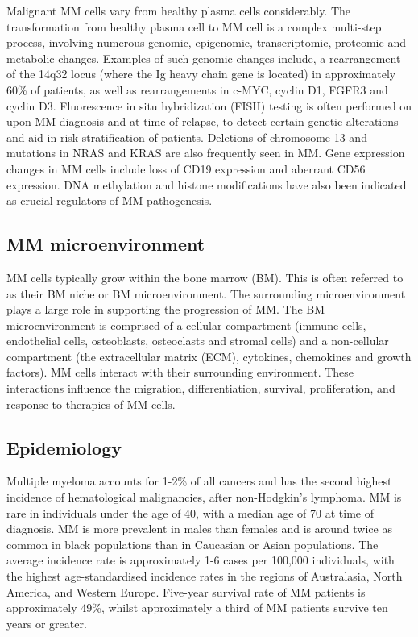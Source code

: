 Malignant MM cells vary from healthy plasma cells considerably.
The transformation from healthy plasma cell to MM cell is a complex multi-step process, involving numerous genomic, epigenomic, transcriptomic, proteomic and metabolic changes\cite{de2002comparison, caprio2020epigenetic, chanukuppa2021proteomic, el2018metabolic}.
Examples of such genomic changes include, a rearrangement of the 14q32 locus (where the Ig heavy chain gene is located)\cite{nishida1997ig} in approximately 60\% of patients, as well as rearrangements in c-MYC, cyclin D1, FGFR3 and cyclin D3\cite{de2002comparison}.
Fluorescence in situ hybridization (FISH) testing is often performed on upon MM diagnosis and at time of relapse, to detect certain genetic alterations and aid in risk stratification of patients\cite{swerdlow2008classification}.
Deletions of chromosome 13 and mutations in NRAS and KRAS are also frequently seen in MM\@.
Gene expression changes in MM cells include loss of CD19 expression and aberrant CD56 expression.
DNA methylation and histone modifications have also been indicated as crucial regulators of MM pathogenesis.

\subsection{MM microenvironment}
MM cells typically grow within the bone marrow (BM).
This is often referred to as their BM niche or BM microenvironment.
The surrounding microenvironment plays a large role in supporting the progression of MM.
The BM microenvironment is comprised of a cellular compartment (immune cells, endothelial cells, osteoblasts, osteoclasts and stromal cells) and a non-cellular compartment (the extracellular matrix (ECM), cytokines, chemokines and growth factors)\cite{manier2012bone, kawano2015targeting}.
MM cells interact with their surrounding environment.
These interactions influence the migration, differentiation, survival, proliferation, and response to therapies of MM cells.

\subsection{Epidemiology}
Multiple myeloma accounts for 1-2\% of all cancers and has the second highest incidence of hematological malignancies, after non-Hodgkin's lymphoma\cite{international2003criteria}.
MM is rare in individuals under the age of 40, with a median age of 70 at time of diagnosis\cite{tsang2019multiple, palumbo2011multiple}.
MM is more prevalent in males than females and is around twice as common in black populations than in Caucasian or Asian populations\cite{nhsmyeloma}.
The average incidence rate is approximately 1-6 cases per 100,000 individuals\cite{tsang2019multiple, palumbo2011multiple, teras20162016}, with the highest age-standardised incidence rates in the regions of Australasia, North America, and Western Europe\cite{cowan2018global}.
Five-year survival rate of MM patients is approximately 49\%, whilst approximately a third of MM patients survive ten years or greater\cite{cancerresearchuk, siegel2016cancer}.

